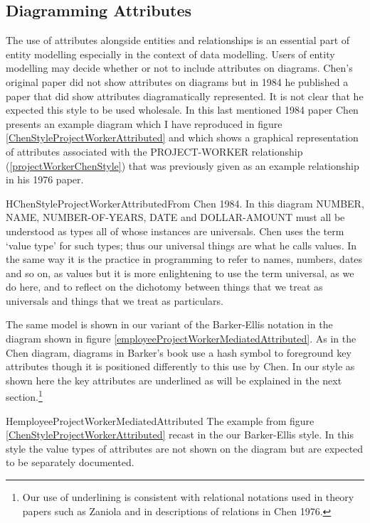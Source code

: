 \subsection*{Diagramming Attributes}
\mynote
The use of attributes alongside entities and relationships is an essential part of entity modelling especially in the context of data modelling. Users of entity modelling may decide whether or not to include attributes on diagrams. Chen's original paper did not show attributes on diagrams  but in 1984
he published a paper that did show attributes diagramatically represented. It is not clear that he expected this style to be used wholesale. 
\mynote
In this last mentioned 1984 paper Chen presents an example diagram 
which I have reproduced in figure  \ref{ChenStyleProjectWorkerAttributed} 
and which shows a graphical representation of attributes associated with the PROJECT-WORKER relationship (\ref{projectWorkerChenStyle}) that was previously given as an example relationship in his 1976 paper.

\begin{erboxedFigure} {H}{ChenStyleProjectWorkerAttributed}{From Chen 1984. In this diagram NUMBER, NAME, NUMBER-OF-YEARS, DATE and DOLLAR-AMOUNT must all be understood as types all of whose instances are universals. Chen uses the term `value type' for such types;
thus our universal things are what he calls values. In the same way it is 
the practice in programming to refer to names, numbers, dates and so on, as values but it is more enlightening to use  the term universal, as we do here, and to reflect on  the dichotomy between things that we treat as universals and things that we treat as particulars. }

\end{erboxedFigure}

The same model is shown in our variant of the Barker-Ellis notation
 in the diagram shown in figure \ref{employeeProjectWorkerMediatedAttributed}.
As in the Chen diagram, diagrams in Barker's book use a hash symbol to foreground key attributes though it  is positioned differently to this use by Chen. In our style as shown here the key attributes are underlined as will be explained in the next section.\footnote{Our use of underlining is consistent with relational notations used in theory papers such as Zaniola and in descriptions of relations in Chen 1976.}
\begin{erboxedFigure} {H}{employeeProjectWorkerMediatedAttributed}
{The example from figure \ref{ChenStyleProjectWorkerAttributed} recast in the our Barker-Ellis style. 
In this style the value types of attributes are not shown on the diagram but are expected to be 
separately documented. }

\end{erboxedFigure}


 


